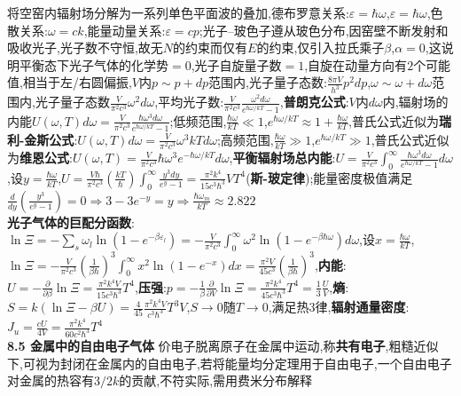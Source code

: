 \documentclass[10pt,a4paper]{article}
\begin{document}
\begin{multicols}{2}
将空窑内辐射场分解为一系列单色平面波的叠加,德布罗意关系:$\varepsilon=\hbar\omega$,$\varepsilon=\hbar\omega$,色散关系:$\omega=ck$,能量动量关系:$\varepsilon=cp$;光子--玻色子遵从玻色分布,因窑壁不断发射和吸收光子,光子数不守恒,故无$N$的约束而仅有$E$的约束,仅引入拉氏乘子$\beta$,$\alpha=0$,这说明平衡态下光子气体的化学势$=0$,光子自旋量子数$=1$,自旋在动量方向有$2$个可能值,相当于左/右圆偏振,$V$内$p\sim p+dp$范围内,光子量子态数:$\frac{8\pi V}{h^3}p^2dp$,$\omega\sim\omega+d\omega$范围内,光子量子态数$\frac{V}{\pi^2c^3}\omega^2d\omega$,平均光子数:$\frac{V}{\pi^2c^3}\frac{\omega^2d\omega}{e^{\hbar\omega/kT}-1}$,\textbf{普朗克公式}:$V$内$d\omega$内,辐射场的内能$U(\omega,T)d\omega=\frac{V}{\pi^2c^3}\frac{\hbar\omega^3d\omega}{e^{\hbar\omega/kT}-1}$;低频范围,$\frac{\hbar\omega}{kT}\ll1$,$e^{\hbar\omega/kT}\approx1+\frac{\hbar\omega}{kT}$,普氏公式近似为\textbf{瑞利-金斯公式}:$U(\omega,T)d\omega=\frac{V}{\pi^2c^3}\omega^3kTd\omega$;高频范围,$\frac{\hbar\omega}{kT}\gg1$,$e^{\hbar\omega/kT}\gg1$,普氏公式近似为\textbf{维恩公式}:$U(\omega,T)=\frac{V}{\pi^2c^3}\hbar\omega^3e^{-\hbar\omega/kT}d\omega$,\textbf{平衡辐射场总内能}:$U=\frac{V}{\pi^2c^3}\int_0^{\infty}\frac{\hbar\omega^3d\omega}{e^{\hbar\omega/kT}-1}d\omega$,设$y=\frac{\hbar\omega}{kT}$,$U=\frac{V\hbar}{\pi^2c^3}\left(\frac{kT}{\hbar}\right)\int_0^{\infty}\frac{y^3dy}{e^y-1}=\frac{\pi^2k^4}{15c^3\hbar^3}VT^4$(\textbf{斯-玻定律});能量密度极值满足$\frac{d}{dy}\left(\frac{y^3}{e^y-1}\right)=0\Rightarrow3-3e^{-y}=y\Rightarrow\frac{\hbar\omega_m}{kT}\approx2.822$\\
\textbf{光子气体的巨配分函数}:$\ln\Xi=-\sum_s\omega_l\ln(1-e^{-\beta\varepsilon_l})=-\frac{V}{\pi^2c^3}\int_0^{\infty}\omega^2\ln(1-e^{-\beta\hbar\omega})d\omega$,设$x=\frac{\hbar\omega}{kT}$,$\ln\Xi=-\frac{V}{\pi^2c^3}\left(\frac{1}{\beta\hbar}\right)^3\int_0^{\infty}x^2\ln(1-e^{-x})dx=\frac{\pi^2V}{45c^3}\left(\frac{1}{\beta\hbar}\right)^3$,\textbf{内能}:$U=-\frac{\partial}{\partial\beta}\ln\Xi=\frac{\pi^2k^4V}{15c^3\hbar^3}T^4$,\textbf{压强}:$p=-\frac{1}{\beta}\frac{\partial}{\partial V}\ln\Xi=\frac{\pi^2k^4}{45c^3\hbar^3}T^4=\frac{1}{3}\frac{U}{V}$,\textbf{熵}:$S=k(\ln\Xi-\beta U)=\frac{4}{45}\frac{\pi^2k^4V}{c^3\hbar^3}T^3V$,$S\rightarrow0$随$T\rightarrow0$,满足热$3$律,\textbf{辐射通量密度}:$J_u=\frac{cU}{4V}=\frac{\pi^2k^4}{60c^2\hbar^3}T^4$\\
\textbf{8.5 金属中的自由电子气体}
价电子脱离原子在金属中运动,称\textbf{共有电子},粗糙近似下,可视为封闭在金属内的自由电子,若将能量均分定理用于自由电子,一个自由电子对金属的热容有$3/2k$的贡献,不符实际,需用费米分布解释\\

\end{multicols}
\end{document}
